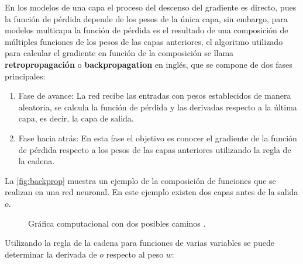 En los modelos de una capa el proceso del descenso del gradiente es directo, pues la función de pérdida depende de los pesos de la
única capa, sin embargo, para modelos multicapa la función de pérdida es el resultado de una composición de múltiples funciones de los pesos de las capas anteriores, el algoritmo utilizado para calcular el gradiente en función de la composición se llama \textbf{retropropagación} \cite{Rumelhart1986} o \textbf{backpropagation} en inglés, que se compone de dos fases principales:
\begin{enumerate}
\item Fase de avance: La red recibe las entradas con pesos establecidos de manera aleatoria, se calcula la función de pérdida y las derivadas respecto a la última capa, es decir, la capa de salida.
  \item Fase hacia atrás: En esta fase el objetivo es conocer el gradiente de la función de pérdida respecto a los pesos de las capas anteriores utilizando la regla de la cadena.
\end{enumerate}

La \autoref{fig:backprop} muestra un ejemplo de la composición de funciones que se realizan en una red neuronal. En este ejemplo existen dos capas antes de la salida $o$.

\begin{figure}[h]
  \centering
\caption{Gráfica computacional con dos posibles caminos \cite{Nielsen:2018}.}
\label{fig:backprop}
\end{figure}

Utilizando la regla de la cadena para funciones de varias variables se puede determinar la derivada de $o$ respecto al peso $w$:

